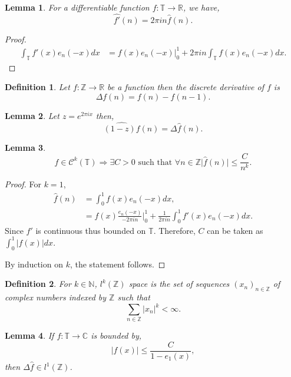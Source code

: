 \documentclass[8pt]{article}
\newtheorem{definition}{Definition}[section]
\newtheorem{lemma}{Lemma}[section]
\newcommand{\ab}[1]{\vert #1 \vert}
\newcommand{\bN}[0]{\mathbb{N}}
\newcommand{\bR}[0]{\mathbb{R}}
\newcommand{\bZ}[0]{\mathbb{Z}}
\newcommand{\bC}[0]{\mathbb{C}}
\newcommand{\bT}[0]{\mathbb{T}}
\newcommand{\cC}[0]{\mathcal{C}}
\begin{document}
\begin{lemma}
  \label{lemma_2_1}
  For a differentiable function $f:\bT\to \bR$, we have,
  \begin{equation*}
    \hat{f'}(n) = 2\pi i n\hat{f}(n).
  \end{equation*}
\end{lemma}
\begin{proof}
  \begin{align*}
    \int_\bT f'(x)e_n(-x)dx & = f(x)e_n(-x)|_0^1+2\pi i n\int_\bT f(x)e_n(-x)dx.
  \end{align*}
\end{proof}
\begin{definition}
  Let $f:\bZ\to \bR$ be a function then the discrete derivative of $f$ is 
  \begin{equation*}
    \Delta f(n) = f(n) - f(n-1).
  \end{equation*}
\end{definition}
\begin{lemma}
  \label{lemma_2_2}
  Let $z = e^{2\pi i x}$ then,
  \begin{equation*}
    \widehat{(1-z)f}(n) = \Delta\hat{f}(n).
  \end{equation*}
\end{lemma}
\begin{lemma}
  \label{lemma_2_3}
  \begin{equation*}
    f\in\cC^k(\bT)\Rightarrow \exists C>0 \text{ such that }\forall n\in \bZ\ab{\hat{f}(n)}\leq {\frac C {n^k}}.
  \end{equation*}
\end{lemma}
\begin{proof}
  For $k=1$, 
  \begin{align*}
    \hat{f}(n) & = \int_0^1f(x)e_n(-x)dx,\\
    & = f(x){\frac {e_n(-x)} {-2\pi in}}|_0^1 +{\frac {1} {2\pi in}} \int_0^1 f'(x)e_n(-x)dx.
  \end{align*}
  Since $f'$ is continuous thus bounded on $\bT$. Therefore, $C$ can be taken as $\int_0^1\ab{f(x)}dx$.
  \par By induction on $k$, the statement follows.
\end{proof}
\begin{definition}
  For $k\in\bN$, $l^k(\bZ)$ space is the set of sequences $(x_n)_{n\in\bZ}$ of complex numbers indexed by $\bZ$ such that 
  \begin{equation*}
    \sum_{n\in\bZ}\ab{x_n}^k<\infty.
  \end{equation*}
\end{definition}
\begin{lemma}
  \label{lemma_2_4}
  If $f:\bT\to \bC$ is bounded by,
  \begin{equation*}
    \ab{f(x)}\leq {\frac C {1-e_1(x)}},
  \end{equation*}
  then $\Delta\hat{f}\in l^1(\bZ)$.
\end{lemma}
  
\end{document}
